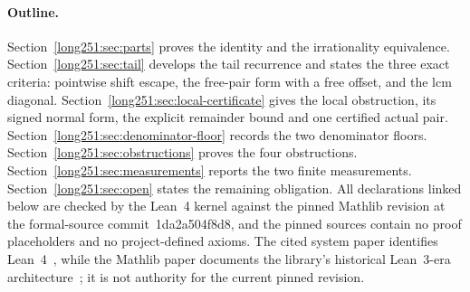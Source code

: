 \documentclass[11pt]{article}
\renewcommand{\commitshort}{1da2a504f8d8}
\begin{document}
\paragraph{Outline.}
Section~\ref{long251:sec:parts} proves the identity and the irrationality equivalence.
Section~\ref{long251:sec:tail} develops the tail recurrence and states the three exact
criteria: pointwise shift escape, the free-pair form with a free offset, and
the lcm diagonal.  Section~\ref{long251:sec:local-certificate} gives the local
obstruction, its signed normal form, the explicit remainder bound and one
certified actual pair.  Section~\ref{long251:sec:denominator-floor} records the two
denominator floors.  Section~\ref{long251:sec:obstructions} proves the four
obstructions.  Section~\ref{long251:sec:measurements} reports the two finite
measurements.  Section~\ref{long251:sec:open} states the remaining obligation.  All
declarations linked below are checked by the Lean~4 kernel against the pinned
Mathlib revision at the formal-source commit~\commitshort, and the pinned
sources contain no proof placeholders and no project-defined axioms.  The
cited system paper identifies Lean~4~\cite[abstract and \S1,
pp.~625--626]{lean4}, while the Mathlib paper documents the library's
historical Lean~3-era architecture~\cite[abstract and \S1.1, p.~367]{mathlib};
it is not authority for the current pinned revision.

\statusboundary
\end{document}
